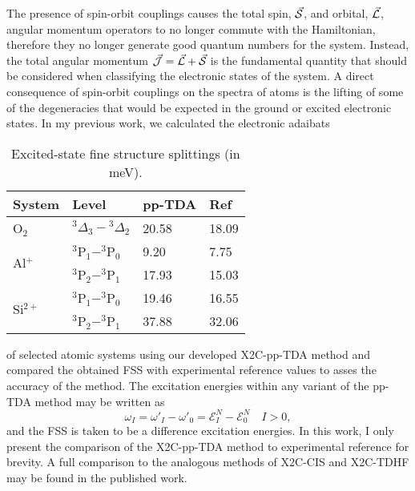 The presence of spin-orbit couplings causes the total spin, $\vec{\mathcal{S}}$, and
orbital, $\vec{\mathcal{L}}$, angular momentum operators to no longer commute with
the Hamiltonian, therefore they no longer generate good quantum numbers for the
system.  Instead, the total angular momentum
$\vec{\mathcal{J}}=\vec{\mathcal{L}}+\vec{\mathcal{S}}$ is the fundamental quantity that should
be considered when classifying the electronic states of the system.  A direct
consequence of spin-orbit couplings on the spectra of atoms is the lifting of
some of the degeneracies that would be expected in the ground or excited
electronic states.  In my previous work, we calculated the electronic adaibats
\begin{wraptable}{hr}{0.45\textwidth}
 \vspace{-0.5cm}
  \caption{\footnotesize Excited-state fine structure splittings (in meV).}
 \label{tb:DoubleEx}
 \centering
 \begin{tabular}{llll}
 System                    & Level & pp-TDA & Ref\cite{NIST_ASD,Krupenie72_423}\\
 \hline
  O$_2$ & $^3\Delta_3-{^3\Delta_2}$ & 20.58 & 18.09 \\ \hline
  \multirow{2}{*}{Al$^+$} & $^3$P$_1-^3$P$_0$ & 9.20 & 7.75 \\ 
  & $^3$P$_2-^3$P$_1$ & 17.93 & 15.03 \\  \hline
  \multirow{2}{*}{Si$^{2+}$} & $^3$P$_1-^3$P$_0$ & 19.46 & 16.55 \\ 
  & $^3$P$_2-^3$P$_1$ & 37.88 & 32.06 \\    \hline
 \end{tabular}
 \vspace{-0.5cm}
\end{wraptable}
of selected atomic systems using our developed X2C-pp-TDA method and compared the
obtained FSS with experimental reference values\cite{NIST_ASD} to asses the
accuracy of the method. The excitation energies within any variant of the pp-TDA
method may be written as
\begin{equation}
\omega_I = \omega'_I - \omega'_0 = \mathcal{E}_I^{N} - \mathcal{E}_0^N 
\quad I > 0,
\end{equation}
and the FSS is taken to be a difference excitation energies.  In this work, I
only present the comparison of the X2C-pp-TDA method to experimental reference
for brevity. A full comparison to the analogous methods of X2C-CIS and X2C-TDHF
may be found in the published work\cite{DBWY16_Accepted1}.

